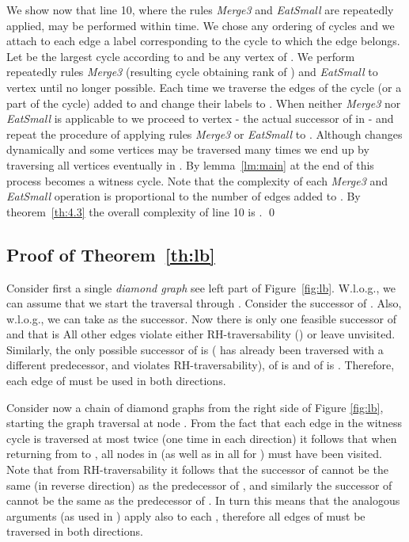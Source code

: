 \documentclass[11pt,envcountsame,oribibl]{llncs}
\begin{document}
We show now that line 10, where the rules {\em Merge3} and {\em EatSmall} are
repeatedly applied, may be performed within  time. We chose any ordering
 of cycles and we attach to each edge a label corresponding to the cycle
to which the edge belongs. Let  be the largest cycle according to 
and  be any vertex of . We perform repeatedly rules {\em Merge3}
(resulting cycle obtaining rank of ) and  {\em EatSmall} to
vertex  until no longer possible. Each time we traverse the edges of
the cycle (or a part of the cycle) added to  and change their labels to .
When neither {\em Merge3} nor {\em EatSmall} is applicable to  we proceed to vertex 
- the actual successor of  in  - and repeat the procedure of applying rules
{\em Merge3} or {\em EatSmall} to . Although  changes dynamically and
some vertices may be traversed many times we end up by traversing all vertices
eventually in . By lemma~\ref{lm:main} at the end of this process
 becomes a witness cycle.
Note that the complexity of each {\em Merge3} and {\em EatSmall} operation is
proportional to the number of edges added to .
By theorem~\ref{th:4.3} the overall complexity of line 10 is . \hfill\qed



\subsection{Proof of Theorem~\ref{th:lb}}
Consider first a single {\sl diamond graph}  see left part of
Figure~\ref{fig:lb}. W.l.o.g., we can assume that we start the traversal
through . Consider the successor of . Also, w.l.o.g., we
can take  as the successor. Now there is only one feasible
successor of  and that is  All other edges violate
either RH-traversability () or leave  unvisited.
Similarly, the only possible successor of  is 
( has already been traversed with a different predecessor,
and  violates RH-traversability), of  is  and
of  is . Therefore, each edge of  must be used in
both directions.

Consider now a chain of diamond graphs from the right side
of Figure \ref{fig:lb}, starting the graph traversal at node .
From the fact that each edge in the witness cycle is traversed at
most twice (one time in each direction) it follows that when returning
from  to , all nodes in  (as well as in all 
for ) must have been visited.
Note that from RH-traversability it follows that the successor of
 cannot be the same (in reverse direction) as the
predecessor of , and similarly the successor of
 cannot be the same as the predecessor of .
In turn this means that the analogous arguments (as used in )
apply also to each , therefore all edges of  must be
traversed in both directions.
\end{document}
